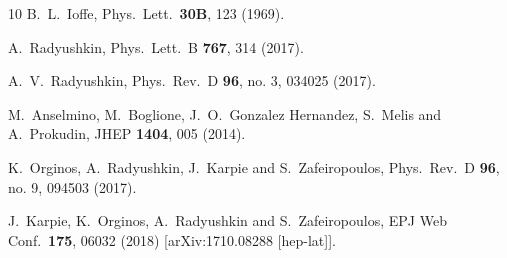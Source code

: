 \documentclass[aps,prd,twocolumn,showpacs,preprintnumbers,superscriptaddress]{revtex4-1}
\begin{document}
\begin{thebibliography}{10}
  B.~L.~Ioffe,
  Phys.\ Lett.\  {\bf 30B}, 123 (1969).


  A.~Radyushkin,
  Phys.\ Lett.\ B {\bf 767}, 314 (2017).


  A.~V.~Radyushkin,
  Phys.\ Rev.\ D {\bf 96}, no. 3, 034025 (2017).


  M.~Anselmino, M.~Boglione, J.~O.~Gonzalez Hernandez, S.~Melis and A.~Prokudin,
  JHEP {\bf 1404}, 005 (2014).


  K.~Orginos, A.~Radyushkin, J.~Karpie and S.~Zafeiropoulos,
  Phys.\ Rev.\ D {\bf 96}, no. 9, 094503 (2017).


  J.~Karpie, K.~Orginos, A.~Radyushkin and S.~Zafeiropoulos,
  EPJ Web Conf.\  {\bf 175}, 06032 (2018)
  [arXiv:1710.08288 [hep-lat]].



\end{thebibliography}
\end{document}
